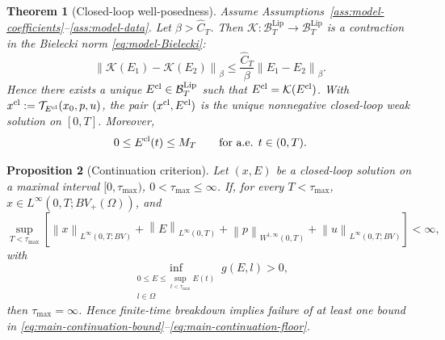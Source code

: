 \documentclass[pdflatex,sn-mathphys-num]{sn-jnl}
\theoremstyle{thmstyleone}
\newtheorem{theorem}{Theorem}[section]
\newtheorem{proposition}[theorem]{Proposition}
\theoremstyle{definition}
\theoremstyle{remark}
\newcommand{\Om}{\Omega}
\newcommand{\Kcal}{\mathcal{K}}
\newcommand{\Btl}{\mathcal{B}_T^{\mathrm{Lip}}}
\newcommand{\norm}[1]{\left\lVert#1\right\rVert}
\numberwithin{equation}{section}
\begin{document}
\begin{theorem}[Closed-loop well-posedness]
\label{thm:main-wellposedness}
Assume Assumptions~\ref{ass:model-coefficients}--\ref{ass:model-data}. Let
$\displaystyle 
\beta>\widehat C_T$.
Then
$\displaystyle 
\Kcal:\Btl\to\Btl$
is a contraction in the Bielecki norm \eqref{eq:model-Bielecki}:
\[
\norm{\Kcal(E_1)-\Kcal(E_2)}_\beta
\le
\frac{\widehat C_T}{\beta}
\norm{E_1-E_2}_\beta.
\]
Hence there exists a unique \(E^{\rm cl}\in\mathcal B_T^{\rm Lip}\) such that
$E^{\rm cl}=\mathcal K(E^{\rm cl})$.
With
$x^{\rm cl}:=\mathcal T_{E^{\rm cl}}(x_0,p,u)$,
the pair \((x^{\rm cl},E^{\rm cl})\) is the unique nonnegative closed-loop weak
solution on \([0,T]\). Moreover,
\[
0\le E^{\rm cl}(t)\le M_T
\qquad\text{for a.e. }t\in(0,T).
\]
\end{theorem}
\begin{proposition}[Continuation criterion]
\label{prop:main-continuation}
Let \((x,E)\) be a closed-loop solution on a maximal interval
$[0,\tau_{\max})$,
$0<\tau_{\max}\le\infty$.
If, for every \(T<\tau_{\max}\),
$\displaystyle 
x\in L^\infty(0,T;BV_+(\Om))$,
and
\begin{equation}
\label{eq:main-continuation-bound}
\sup_{T<\tau_{\max}}
\left[
\norm{x}_{L^\infty(0,T;BV)}
+
\norm{E}_{L^\infty(0,T)}
+
\norm{p}_{W^{1,\infty}(0,T)}
+
\norm{u}_{L^\infty(0,T;BV)}
\right]<\infty,
\end{equation}
with
\begin{equation}
\label{eq:main-continuation-floor}
\inf_{\substack{0\le E\le \sup_{t<\tau_{\max}}E(t)\\ l\in\Om}}
g(E,l)>0,
\end{equation}
then \(\tau_{\max}=\infty\). Hence finite-time breakdown implies failure of at
least one bound in \eqref{eq:main-continuation-bound}--\eqref{eq:main-continuation-floor}.
\end{proposition}
\end{document}
